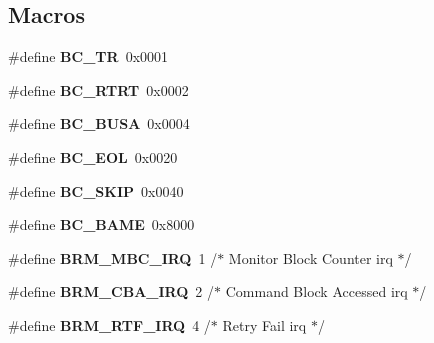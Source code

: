 \subsection*{Macros}
\begin{DoxyCompactItemize}
\item 
\mbox{\label{group__B1553BRM_ga5d2670e1164f693e0014cb97c03f29ae}} 
\#define {\bfseries B\+C\+\_\+\+TR}~0x0001
\item 
\mbox{\label{group__B1553BRM_gaed2c3405bcafe760d0350f3da2bd6af7}} 
\#define {\bfseries B\+C\+\_\+\+R\+T\+RT}~0x0002
\item 
\mbox{\label{group__B1553BRM_ga1170129eacc0df736a37defa107f7533}} 
\#define {\bfseries B\+C\+\_\+\+B\+U\+SA}~0x0004
\item 
\mbox{\label{group__B1553BRM_gafc5e1d1e009d594e69d029a99ac8b67b}} 
\#define {\bfseries B\+C\+\_\+\+E\+OL}~0x0020
\item 
\mbox{\label{group__B1553BRM_ga32a7fede23960ce33394ece78f70fb8d}} 
\#define {\bfseries B\+C\+\_\+\+S\+K\+IP}~0x0040
\item 
\mbox{\label{group__B1553BRM_ga652a2293871fb09b3309652a8c60f6f2}} 
\#define {\bfseries B\+C\+\_\+\+B\+A\+ME}~0x8000
\item 
\mbox{\label{group__B1553BRM_ga27ca9e161810c35af1843fa33d2aa833}} 
\#define {\bfseries B\+R\+M\+\_\+\+M\+B\+C\+\_\+\+I\+RQ}~1                    /$\ast$ Monitor Block Counter irq $\ast$/
\item 
\mbox{\label{group__B1553BRM_gadb69d0563cbd4584ffa870a10c60f90f}} 
\#define {\bfseries B\+R\+M\+\_\+\+C\+B\+A\+\_\+\+I\+RQ}~2                    /$\ast$ Command Block Accessed irq $\ast$/
\item 
\mbox{\label{group__B1553BRM_gaee6817d84757bc518af24dee384a1fe1}} 
\#define {\bfseries B\+R\+M\+\_\+\+R\+T\+F\+\_\+\+I\+RQ}~4                    /$\ast$ Retry Fail irq $\ast$/
\item 
\mbox{\label{group__B1553BRM_gab2afd41e0bef80649b6fcd8133cbdd64}} 

\end{DoxyCompactItemize}
